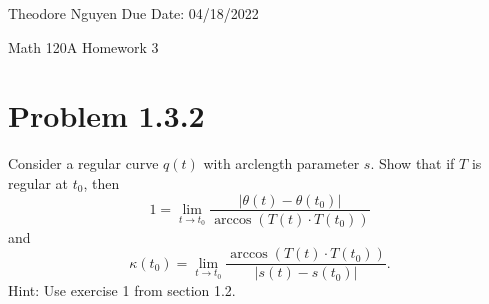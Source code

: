 \documentclass[12pt]{article}
\newcommand\abs[1]{\left| #1 \right|}
\newcommand\parens[1]{\left( #1 \right)}
\begin{document}
\noindent Theodore Nguyen \hfill  Due Date: 04/18/2022

\begin{center}
  {\Huge Math 120A Homework 3}
\end{center}

\section*{Problem 1.3.2}
Consider a regular curve $q(t)$ with arclength parameter $s$. Show that if $T$ is regular at $t_0$, then
\[1 = \lim_{t \rightarrow t_0} \frac{\abs{\theta\parens{t} - \theta\parens{t_0}}}{\arccos\parens{T\parens{t} \cdot T\parens{t_0}}}\] 
and
\[\kappa\parens{t_0} = \lim_{t \rightarrow t_0} \frac{\arccos\parens{T\parens{t} \cdot T\parens{t_0}}}{\abs{s\parens{t} - s\parens{t_0}}}.\] 
Hint: Use exercise 1 from section 1.2.
\end{document}
